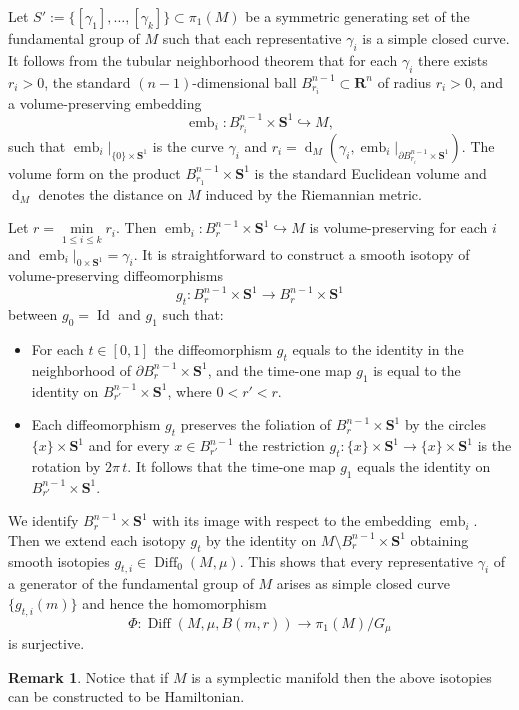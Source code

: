 \documentclass[a4paper,12pt]{amsart}
\def\Diff{\operatorname{Diff}}
\def\g{\gamma}
\theoremstyle{definition}
\newtheorem{rem}[thm]{Remark}
\def\OP{\operatorname}
\def\B{\mathbf}
\begin{document}
Let $S':=\{[\g_1],\ldots,[\g_k]\}\subset \pi_1(M)$ be a symmetric
generating set of the fundamental group of $M$ such that each
representative $\g_i$ is a simple closed curve. It follows from the
tubular neighborhood theorem that for each $\g_i$ there exists
$r_i>0$, the standard $(n-1)$-dimensional ball
$B_{r_i}^{n-1} \subset \B{R}^n$ of radius $r_i>0$,
and a volume-preserving embedding
$$
\OP{emb}_i:B_{r_i}^{n-1}\times \B S^1\hookrightarrow M,
$$
such that $\OP{emb}_i|_{\{0\}\times \B S^1}$ is the curve $\g_i$ and
$r_i=\OP{d}_M(\g_i, \OP{emb}_i|_{\partial B_{r_i}^{n-1}\times \B S^1})$.
The volume form on the product $B_{r_1}^{n-1}\times \B S^1$ is the
standard Euclidean volume and $\OP{d}_M$ denotes the distance on
$M$ induced by the Riemannian metric.

Let $r=\min\limits_{1\leq i\leq k}{r_i}$. Then
$\OP{emb}_i:B_r^{n-1}\times \B S^1\hookrightarrow M$
is volume-preserving for each $i$ and
$\OP{emb}_i|_{{0}\times  \B S^1}=\g_i$.
It is straightforward to
construct a smooth isotopy of volume-preserving diffeomorphisms
$$
g_t:B_{r}^{n-1}\times \B S^1\to B_{r}^{n-1}\times \B S^1
$$
between $g_0=\OP{Id}$ and $g_1$ such that:
\begin{itemize}
\item
For each $t\in [0,1]$ the diffeomorphism $g_t$ equals to the identity
in the neighborhood of $\partial B_{r}^{n-1}\times \B S^1$, and
the time-one map $g_1$ is equal to the identity on $B_{r'}^{n-1}\times \B S^1$,
where $0<r'<r$.
\item
Each diffeomorphism $g_t$ preserves the foliation of
$B_r^{n-1}\times \B S^1$ by the circles $\{x\}\times \B S^1$ and for
every $x\in B^{n-1}_{r'}$ the restriction
$g_t\colon \{x\}\times \B S^1\to \{x\}\times \B S^1$ is the rotation
by $2\pi\,t$. It follows that the time-one map $g_1$ equals the
identity on $B^{n-1}_{r'}\times \B S^1$.
\end{itemize}

We identify $B^{n-1}_{r}\times \B S^1$ with its image
with respect to the embedding $\OP{emb}_i$. Then we extend
each isotopy $g_t$ by the identity on
$M\setminus B_r^{n-1}\times \B S^1$
obtaining smooth isotopies $g_{t,i}\in \Diff_0(M,\mu)$.
This shows that every representative $\g_i$ of a generator
of the fundamental group of $M$ arises as simple closed
curve $\{g_{t,i}(m)\}$ and hence the homomorphism
$$
\Phi\colon \Diff(M,\mu,B(m,r))\to \pi_1(M)/G_{\mu}
$$
is surjective.

\begin{rem}\label{R:symp}
Notice that if $M$ is a symplectic manifold then the
above isotopies can be constructed to be Hamiltonian.
\end{rem}
\end{document}
